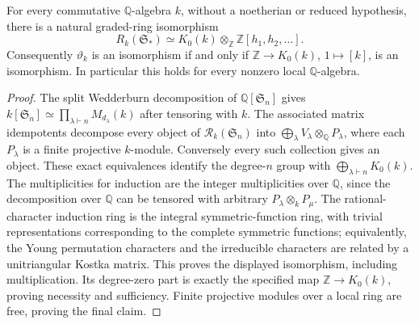 \begin{proposition}
\label{C:Qalgebras}
For every commutative $\mathbb Q$-algebra $k$, without a noetherian or reduced
hypothesis, there is a natural graded-ring isomorphism
\[
 R_k(\mathfrak S_*)\simeq K_0(k)\otimes_{\mathbb Z}\mathbb Z[h_1,h_2,\ldots].
\]
Consequently $\vartheta_k$ is an isomorphism if and only if
$\mathbb Z\longrightarrow K_0(k)$, $1\mapsto[k]$, is an isomorphism.
In particular this holds for every nonzero local $\mathbb Q$-algebra.
\end{proposition}
\begin{proof}
The split Wedderburn decomposition of $\mathbb Q[\mathfrak S_n]$ gives
$k[\mathfrak S_n]\simeq\prod_{\lambda\vdash n}M_{d_\lambda}(k)$ after tensoring
with $k$.  The associated matrix idempotents decompose every object of
$\mathcal R_k(\mathfrak S_n)$ into
$\bigoplus_\lambda V_\lambda\otimes_{\mathbb Q}P_\lambda$, where each
$P_\lambda$ is a finite projective $k$-module. Conversely every such collection
gives an object. These exact equivalences identify the degree-$n$ group with
$\bigoplus_{\lambda\vdash n}K_0(k)$. The multiplicities for induction are the
integer multiplicities over $\mathbb Q$, since the decomposition over $\mathbb Q$
can be tensored with arbitrary $P_\lambda\otimes_kP_\mu$.
The rational-character induction ring is the integral symmetric-function ring,
with trivial representations corresponding to the complete symmetric functions;
equivalently, the Young permutation characters and the irreducible characters
are related by a unitriangular Kostka matrix. This proves the displayed
isomorphism, including multiplication. Its degree-zero part is exactly the
specified map $\mathbb Z\to K_0(k)$, proving necessity and sufficiency.
Finite projective modules over a local ring are free, proving the final claim.
\end{proof}


